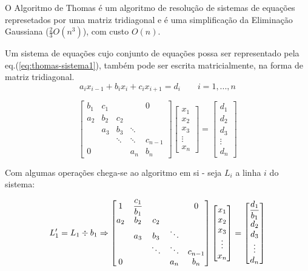 O Algoritmo de Thomas é um algoritmo de resolução de sistemas de equações represetados por uma matriz tridiagonal e é uma simplificação da Eliminação Gaussiana ($\frac{2}{3}O(n^3)$), com custo $O(n)$.

Um sistema de equações cujo conjunto de equações possa ser representado pela eq.(\ref{eq:thomas-sistema1}), também pode ser escrita matricialmente, na forma de matriz tridiagonal.
\begin{equation}
\label{eq:thomas-sistema1}
a_i x_{i-1} + b_i x_i + c_i x_{i+1} = d_i \qquad i = 1, ..., n
\end{equation}

\begin{equation*}
	\begin{bmatrix}
		b_1 & c_1 &         &        & 0\\
		a_2 & b_2 &   c_2   &        & \\
		    & a_3 &   b_3   & \ddots & \\
		    &     &  \ddots & \ddots & c_{n-1} \\
	     0  &     &         &  a_n   & b_n 
	\end{bmatrix}
	\begin{bmatrix}
		x_1 \\
		x_2 \\
		x_3 \\
		\vdots \\
		x_n
	\end{bmatrix}
	=\begin{bmatrix}
		d_1 \\
		d_2 \\
		d_3 \\
		\vdots \\
		d_n
	\end{bmatrix}
\end{equation*}

Com algumas operações chega-se ao algoritmo em si - seja $L_i$ a linha $i$ do sistema:

\begin{equation*}
	L_1' = L_1 \divisionsymbol b_1 \Rightarrow
	\begin{bmatrix}
		1 & \dfrac{c_1}{b_1} &         &        & 0\\
		a_2 & b_2 &   c_2   &        & \\
		    & a_3 &   b_3   & \ddots & \\
		    &     &  \ddots & \ddots & c_{n-1} \\
	     0  &     &         &  a_n   & b_n 
	\end{bmatrix}
	\begin{bmatrix}
		x_1 \\
		x_2 \\
		x_3 \\
		\vdots \\
		x_n
	\end{bmatrix}
	=\begin{bmatrix}
		\dfrac{d_1}{b_1} \\
		d_2 \\
		d_3 \\
		\vdots \\
		d_n
	\end{bmatrix}
\end{equation*}

